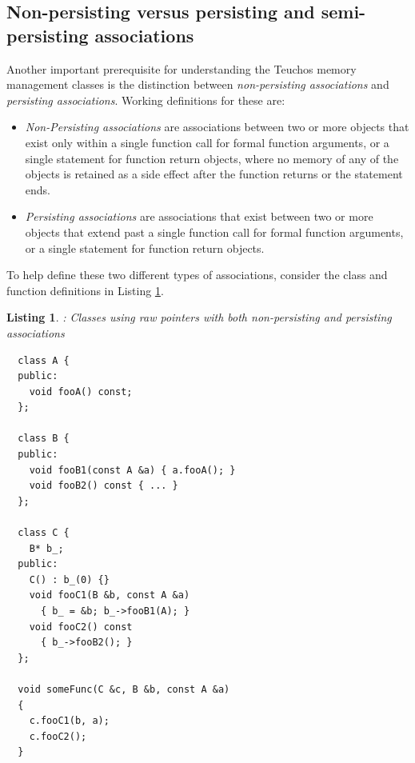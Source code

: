 \documentclass[pdf,ps2pdf,11pt]{SANDreport}
\newtheorem{listing}{Listing}
\begin{document}
%
{}\subsection{Non-persisting versus persisting and semi-persisting
associations}
\label{sec:nonpersisting-persisting-associations}
%

Another important prerequisite for understanding the Teuchos memory
management classes is the distinction between {}\textit{non-persisting
associations} and {}\textit{persisting associations}.  Working
definitions for these are:

\begin{itemize}

{}\item\textit{Non-Persisting associations} are associations between
two or more objects that exist only within a single function call for
formal function arguments, or a single statement for function return
objects, where no memory of any of the objects is retained as a side
effect after the function returns or the statement ends.

{}\item\textit{Persisting associations} are associations that exist
between two or more objects that extend past a single function call
for formal function arguments, or a single statement for function
return objects.

\end{itemize}

To help define these two different types of associations, consider the
class and function definitions in Listing
{}\ref{listing:NonPersistingPersistingAssociationsRawPointers}.


{}\begin{listing}: Classes using raw pointers with both non-persisting
and persisting associations
\label{listing:NonPersistingPersistingAssociationsRawPointers}
{\small\begin{verbatim}
  class A {
  public:
    void fooA() const;
  };

  class B {
  public:
    void fooB1(const A &a) { a.fooA(); }
    void fooB2() const { ... }
  };

  class C {
    B* b_;    
  public:
    C() : b_(0) {}
    void fooC1(B &b, const A &a)
      { b_ = &b; b_->fooB1(A); }
    void fooC2() const
      { b_->fooB2(); }
  };

  void someFunc(C &c, B &b, const A &a)
  {
    c.fooC1(b, a);
    c.fooC2();
  }
\end{verbatim}}
\end{listing}
\end{document}
